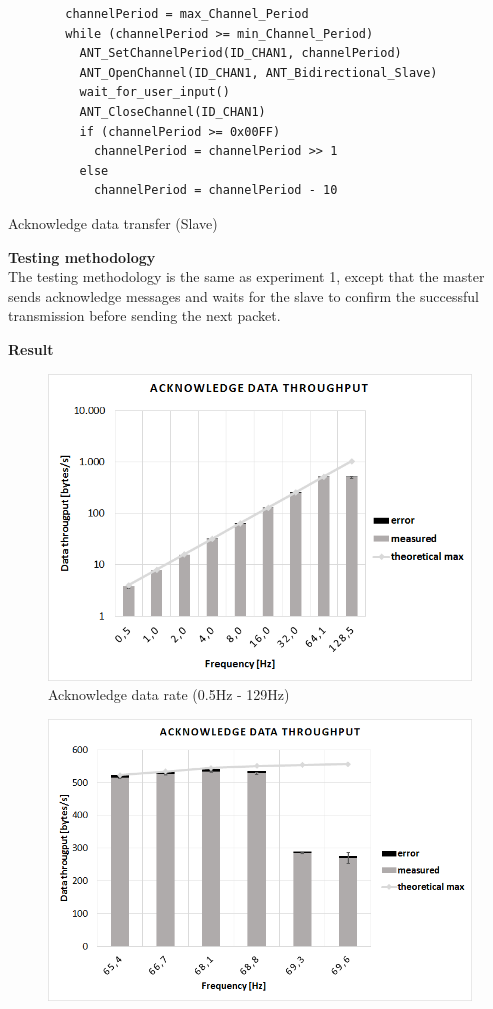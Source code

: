 \begin{description}
	\begin{code}[H]
		\begin{verbatim}
		channelPeriod = max_Channel_Period
		while (channelPeriod >= min_Channel_Period) 
		  ANT_SetChannelPeriod(ID_CHAN1, channelPeriod)
		  ANT_OpenChannel(ID_CHAN1, ANT_Bidirectional_Slave)
		  wait_for_user_input()
		  ANT_CloseChannel(ID_CHAN1)
		  if (channelPeriod >= 0x00FF)
		    channelPeriod = channelPeriod >> 1
		  else
		    channelPeriod = channelPeriod - 10
		\end{verbatim}
		\caption{Acknowledge data transfer (Slave)}\label{lst:sExp3}
	\end{code}
	\item{\textbf{Testing methodology}} \hfill \\ The testing methodology is the same as experiment 1, except that the master sends acknowledge messages and waits for the slave to confirm the successful transmission before sending the next packet. 
	\item{\textbf{Result}} \hfill \\
	\begin{figure}[H]
		\centering
		\includegraphics[scale=0.5]{content/images/exp3_norm.png}
		\caption{Acknowledge data rate (0.5Hz - 129Hz)}\label{fig:exp4norm}
	\end{figure}
	\begin{figure}[H]
		\centering
		\includegraphics[scale=0.5]{content/images/exp3_detail.png}

\end{figure}
\end{description}
